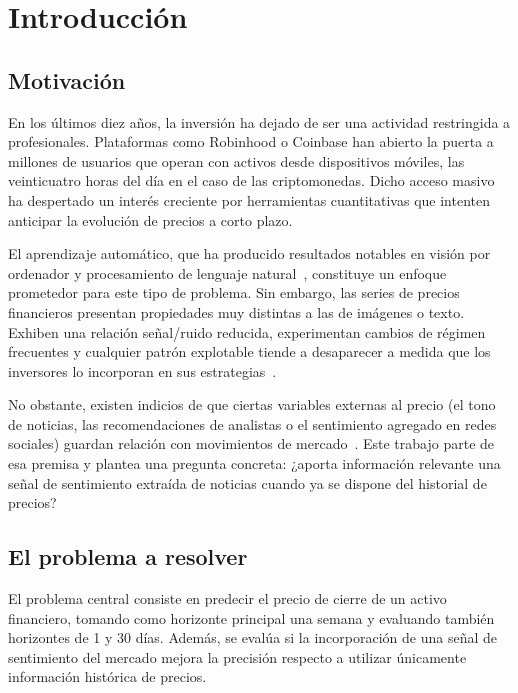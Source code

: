 \chapter{Introducción}
\label{ch:introduccion}

\section{Motivación}

En los últimos diez años, la inversión ha dejado de ser una actividad restringida a profesionales. Plataformas como Robinhood o Coinbase han abierto la puerta a millones de usuarios que operan con activos desde dispositivos móviles, las veinticuatro horas del día en el caso de las criptomonedas. Dicho acceso masivo ha despertado un interés creciente por herramientas cuantitativas que intenten anticipar la evolución de precios a corto plazo.

El aprendizaje automático, que ha producido resultados notables en visión por ordenador y procesamiento de lenguaje natural~\cite{lecun2015deep}, constituye un enfoque prometedor para este tipo de problema. Sin embargo, las series de precios financieros presentan propiedades muy distintas a las de imágenes o texto. Exhiben una relación señal/ruido reducida, experimentan cambios de régimen frecuentes y cualquier patrón explotable tiende a desaparecer a medida que los inversores lo incorporan en sus estrategias~\cite{fama1970efficient}.

No obstante, existen indicios de que ciertas variables externas al precio (el tono de noticias, las recomendaciones de analistas o el sentimiento agregado en redes sociales) guardan relación con movimientos de mercado~\cite{baker2007investor, bollen2011twitter}. Este trabajo parte de esa premisa y plantea una pregunta concreta: ¿aporta información relevante una señal de sentimiento extraída de noticias cuando ya se dispone del historial de precios?

\section{El problema a resolver}

El problema central consiste en predecir el precio de cierre de un activo financiero, tomando como horizonte principal una semana y evaluando también horizontes de 1 y 30 días. Además, se evalúa si la incorporación de una señal de sentimiento del mercado mejora la precisión respecto a utilizar únicamente información histórica de precios.

